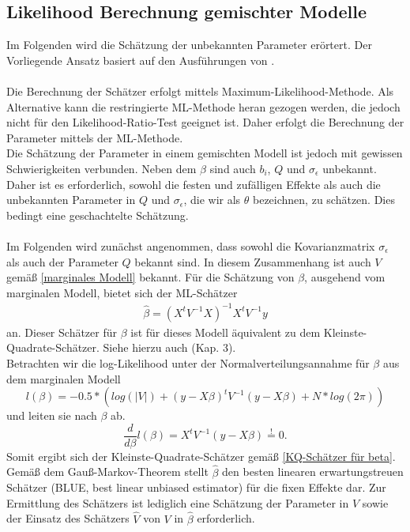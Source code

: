 \documentclass[%
thesis=student,%
coverpage=false,%
titlepage=false,%
headmarks=true, %
german,%
font=libertine, %
math=newpxtx, %
BCOR=5mm,%
coverBCOR=11mm%
]{tumbook}
\theoremstyle{break}
\begin{document}
\subsection{Likelihood Berechnung gemischter Modelle}
Im Folgenden wird die Schätzung der unbekannten Parameter erörtert. Der Vorliegende Ansatz basiert auf den Ausführungen von \cite{fahrmeir-2011-regression}.\\
\\
Die Berechnung der Schätzer erfolgt mittels Maximum-Likelihood-Methode. Als Alternative kann die restringierte ML-Methode heran gezogen werden, die jedoch nicht für den Likelihood-Ratio-Test geeignet ist. Daher erfolgt die Berechnung der Parameter mittels der ML-Methode.\\
Die Schätzung der Parameter in einem gemischten Modell ist jedoch mit gewissen Schwierigkeiten verbunden. Neben dem $\beta$ sind auch $b_i$, $Q$ und $\sigma_\epsilon$ unbekannt. Daher ist es erforderlich, sowohl die festen und zufälligen Effekte als auch die unbekannten Parameter in $Q$ und $\sigma_\epsilon$, die wir als $\theta$ bezeichnen, zu schätzen. Dies bedingt eine geschachtelte Schätzung.\\
\\
Im Folgenden wird zunächst angenommen, dass sowohl die Kovarianzmatrix $\sigma_\epsilon$ als auch der Parameter $Q$ bekannt sind. In diesem Zusammenhang ist auch $V$ gemäß \ref{marginales Modell} bekannt. Für die Schätzung von $\beta$, ausgehend vom marginalen Modell, bietet sich der ML-Schätzer 
\begin{align}
	\hat{\beta} = (X^t V^{-1}X)^{-1}X^t V^{-1}y \label{KQ-Schätzer für beta}
\end{align} an.
Dieser Schätzer für $\beta$ ist für dieses Modell äquivalent zu dem Kleinste-Quadrate-Schätzer. Siehe hierzu auch \cite{fahrmeir-2011-regression} (Kap. 3).\\
Betrachten wir die log-Likelihood unter der Normalverteilungsannahme für $\beta$ aus dem marginalen Modell
$$ l(\beta) =  -0.5 * (log(|V|)+ (y-X\beta)^t V^{-1}(y-X\beta) + N * log(2\pi))$$ und leiten sie nach $\beta$ ab.
$$\frac{d}{d\beta}l(\beta) = X^t V^{-1} (y-X\beta) \stackrel{!}{=} 0. $$ Somit ergibt sich der Kleinste-Quadrate-Schätzer gemäß \ref{KQ-Schätzer für beta}.\\
Gemäß dem Gauß-Markov-Theorem stellt $\hat{\beta}$ den besten linearen erwartungstreuen Schätzer (BLUE, best linear unbiased estimator) für die fixen Effekte dar. Zur Ermittlung des Schätzers ist lediglich eine Schätzung der Parameter in $V$ sowie der Einsatz des Schätzers $\hat{V} $ von $V$ in $\hat{\beta}$ erforderlich. \\
\end{document}
